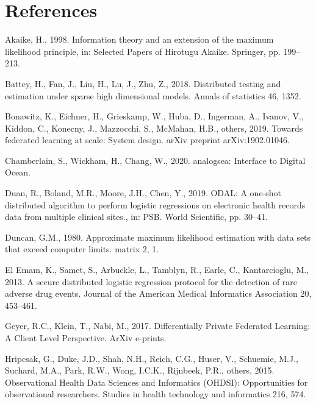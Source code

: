 \documentclass[]{elsarticle} %
\newlength{\cslhangindent}
\newenvironment{cslreferences}%
  {\setlength{\parindent}{0pt}%
  \everypar{\setlength{\hangindent}{\cslhangindent}}\ignorespaces}%
  {\par}
\begin{document}
\hypertarget{references}{%
\section*{References}\label{references}}

\hypertarget{refs}{}
\begin{cslreferences}
\leavevmode\hypertarget{ref-akaike1998information}{}%
Akaike, H., 1998. Information theory and an extension of the maximum likelihood principle, in: Selected Papers of Hirotugu Akaike. Springer, pp. 199--213.

\leavevmode\hypertarget{ref-battey2018distributed}{}%
Battey, H., Fan, J., Liu, H., Lu, J., Zhu, Z., 2018. Distributed testing and estimation under sparse high dimensional models. Annals of statistics 46, 1352.

\leavevmode\hypertarget{ref-bonawitz2019towards}{}%
Bonawitz, K., Eichner, H., Grieskamp, W., Huba, D., Ingerman, A., Ivanov, V., Kiddon, C., Konecny, J., Mazzocchi, S., McMahan, H.B., others, 2019. Towards federated learning at scale: System design. arXiv preprint arXiv:1902.01046.

\leavevmode\hypertarget{ref-analogsea}{}%
Chamberlain, S., Wickham, H., Chang, W., 2020. analogsea: Interface to Digital Ocean.

\leavevmode\hypertarget{ref-duan2019odal}{}%
Duan, R., Boland, M.R., Moore, J.H., Chen, Y., 2019. ODAL: A one-shot distributed algorithm to perform logistic regressions on electronic health records data from multiple clinical sites., in: PSB. World Scientific, pp. 30--41.

\leavevmode\hypertarget{ref-duncan1980approximate}{}%
Duncan, G.M., 1980. Approximate maximum likelihood estimation with data sets that exceed computer limits. matrix 2, 1.

\leavevmode\hypertarget{ref-spark}{}%
El Emam, K., Samet, S., Arbuckle, L., Tamblyn, R., Earle, C., Kantarcioglu, M., 2013. A secure distributed logistic regression protocol for the detection of rare adverse drug events. Journal of the American Medical Informatics Association 20, 453--461.

\leavevmode\hypertarget{ref-2017arXiv171207557G}{}%
Geyer, R.C., Klein, T., Nabi, M., 2017. Differentially Private Federated Learning: A Client Level Perspective. ArXiv e-prints.

\leavevmode\hypertarget{ref-ohdsi}{}%
Hripcsak, G., Duke, J.D., Shah, N.H., Reich, C.G., Huser, V., Schuemie, M.J., Suchard, M.A., Park, R.W., Wong, I.C.K., Rijnbeek, P.R., others, 2015. Observational Health Data Sciences and Informatics (OHDSI): Opportunities for observational researchers. Studies in health technology and informatics 216, 574.


\end{cslreferences}
\end{document}
